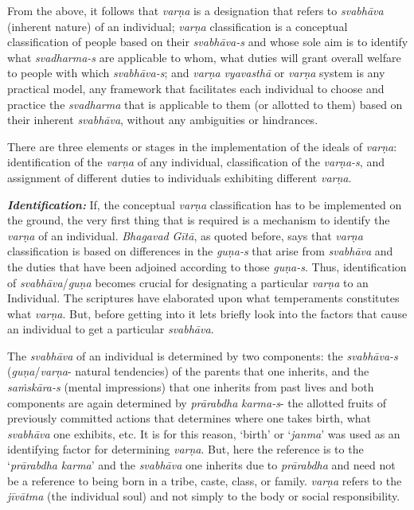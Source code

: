 From the above, it follows that \emph{varṇa} is a designation that refers to \emph{svabhāva} (inherent nature) of an individual; \emph{varṇa} classification is a conceptual classification of people based on their \emph{svabhāva-s} and whose sole aim is to identify what \emph{svadharma-s} are applicable to whom, what duties will grant overall welfare to people with which \emph{svabhāva-s}; and \emph{varṇa} \emph{vyavasthā} or \emph{varṇa} system is any practical model, any framework that facilitates each individual to choose and practice the \emph{svadharma} that is applicable to them (or allotted to them) based on their inherent \emph{svabhāva}, without any ambiguities or hindrances.

There are three elements or stages in the implementation of the ideals of \emph{varṇa}: identification of the \emph{varṇa} of any individual, classification of the \emph{varṇa-s}, and assignment of different duties to individuals exhibiting different \emph{varṇa}.

\emph{\textbf{Identification:}} If, the conceptual \emph{varṇa} classification has to be implemented on the ground, the very first thing that is required is a mechanism to identify the \emph{varṇa} of an individual. \emph{Bhagavad} \emph{Gītā}, as quoted before, says that \emph{varṇa} classification is based on differences in the \emph{guṇa-s} that arise from \emph{svabhāva} and the duties that have been adjoined according to those \emph{guṇa-s}. Thus, identification of \emph{svabhāva}/\emph{guṇa} becomes crucial for designating a particular \emph{varṇa} to an Individual. The scriptures have elaborated upon what temperaments constitutes what \emph{varṇa}. But, before getting into it lets briefly look into the factors that cause an individual to get a particular \emph{svabhāva}.

The \emph{svabhāva} of an individual is determined by two components: the \emph{svabhāva-s} (\emph{guṇa}/\emph{varṇa}- natural tendencies) of the parents that one inherits, and the \emph{saṁskāra-s} (mental impressions) that one inherits from past lives and both components are again determined by \emph{prārabdha} \emph{karma-s}- the allotted fruits of previously committed actions that determines where one takes birth, what \emph{svabhāva} one exhibits, etc. It is for this reason, `birth' or `\emph{janma}' was used as an identifying factor for determining \emph{varṇa}. But, here the reference is to the `\emph{prārabdha} \emph{karma}' and the \emph{svabhāva} one inherits due to \emph{prārabdha} and need not be a reference to being born in a tribe, caste, class, or family. \emph{varṇa} refers to the \emph{jīvātma} (the individual soul) and not simply to the body or social responsibility.

